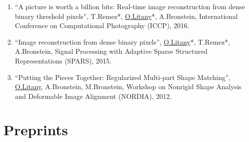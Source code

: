 \begin{enumerate}
\item ``A picture is worth a billion bits: Real-time image reconstruction from dense binary threshold pixels'', T.Remez*, \underline{O.Litany}*, A.Bronstein, International Conference on Computational Photography (ICCP), 2016.

\item ``Image reconstruction from dense binary pixels'', \underline{O.Litany}*, T.Remez*, A.Bronstein, Signal Processing with Adaptive Sparse Structured Representations (SPARS), 2015.

\item ``Putting the Pieces Together: Regularized Multi-part Shape Matching'', \underline{O.Litany}, A.Bronstein, M.Bronstein, Workshop on Nonrigid Shape Analysis and Deformable Image Alignment (NORDIA), 2012.

\end{enumerate}

\section{\sc Preprints}

